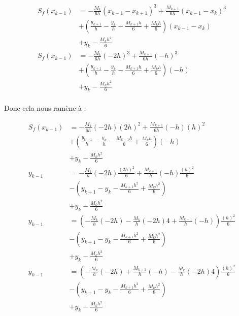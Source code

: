 \documentclass{article}
\begin{document}
\begin{enumerate}
\begin{enumerate}
    \begin{equation*}
      \begin{split}
        S_f(x_{k - 1}) & = - \frac{M_k}{6h} (x_{k - 1} - x_{k + 1})^3 + 
        \frac{M_{k + 1}}{6h} (x_{k - 1} - x_k)^3 \\
        & + \left( \frac{y_{k + 1}}{h} - \frac{y_k}{h} - \frac{M_{k
            + 1} h}{6} + \frac{M_k h}{6} \right) (x_{k - 1} - x_k) \\
        & + y_k - \frac{M_k h^2}{6} \\
        S_f(x_{k - 1}) & = - \frac{M_k}{6h} (- 2h)^3 + 
        \frac{M_{k + 1}}{6h} (-h)^3 \\
        & + \left( \frac{y_{k + 1}}{h} - \frac{y_k}{h} - \frac{M_{k
            + 1} h}{6} + \frac{M_k h}{6} \right) (-h) \\
        & + y_k - \frac{M_k h^2}{6} \\
      \end{split}
    \end{equation*}

    Donc cela nous ramène à :
    
    \begin{equation*}
      \begin{split}
        S_f(x_{k - 1}) & = - \frac{M_k}{6h} (- 2h) (2h)^2 + 
        \frac{M_{k + 1}}{6h} (-h) (h)^2 \\
        & + \left( \frac{y_{k + 1}}{h} - \frac{y_k}{h} - \frac{M_{k
            + 1} h}{6} + \frac{M_k h}{6} \right) (-h) \\
        & + y_k - \frac{M_k h^2}{6} \\
        y_{k - 1} & = - \frac{M_k}{h} (- 2h) \frac{(2h)^2}{6} + 
        \frac{M_{k + 1}}{h} (-h) \frac{(h)^2}{6} \\
        & - \left( y_{k + 1} - y_k - \frac{M_{k
            + 1} h^2}{6} + \frac{M_k h^2}{6} \right) \\
        & + y_k - \frac{M_k h^2}{6} \\
        y_{k - 1} & = \left( - \frac{M_k}{h} (- 2h) - \frac{M_k}{h} (-
        2h) 4 + \frac{M_{k + 1}}{h} (-h) \right) \frac{(h)^2}{6} \\
        & - \left( y_{k + 1} - y_k - \frac{M_{k
            + 1} h^2}{6} + \frac{M_k h^2}{6} \right) \\
        & + y_k - \frac{M_k h^2}{6} \\
        y_{k - 1} & = \left( - \frac{M_k}{h} (- 2h) + \frac{M_{k + 1}}{h} (-h) - \frac{M_k}{h} (-
        2h) 4 \right) \frac{(h)^2}{6} \\
        & - \left( y_{k + 1} - y_k - \frac{M_{k
            + 1} h^2}{6} + \frac{M_k h^2}{6} \right) \\
        & + y_k - \frac{M_k h^2}{6} \\
      \end{split}
    \end{equation*}


\end{enumerate}
\end{enumerate}
\end{document}
